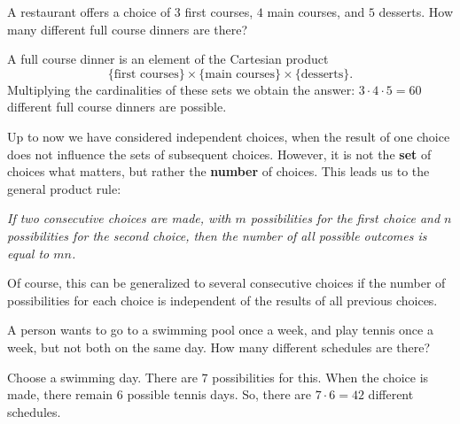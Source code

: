\begin{page}

\begin{exl}
A restaurant offers a choice of $3$ first courses, $4$ main courses, and $5$ desserts.
How many different full course dinners are there?

A full course dinner is an element of the Cartesian product
\[
\{\text{first courses}\} \times \{\text{main courses}\} \times \{\text{desserts}\}.
\]
Multiplying the cardinalities of these sets we obtain the answer: $3 \cdot 4 \cdot 5 = 60$ different full course dinners are possible.
\end{exl}

\end{page}

\begin{page}


Up to now we have considered independent choices,
when the result of one choice does not influence the sets of subsequent choices.
However, it is not the \textbf{set} of choices what matters, but rather the \textbf{number} of choices.
This leads us to the general product rule:
\begin{center}
\parbox{.9\textwidth}{\emph{If two consecutive choices are made, with $m$ possibilities for the first choice and $n$ possibilities for the second choice,
then the number of all possible outcomes is equal to $mn$.}}
\end{center}
Of course, this can be generalized to several consecutive choices
if the number of possibilities for each choice is independent of the results of all previous choices.


\end{page}

\begin{page}

\begin{exl}
A person wants to go to a swimming pool once a week, and play tennis once a week, but not both on the same day.
How many different schedules are there?

Choose a swimming day. There are $7$ possibilities for this.
When the choice is made, there remain $6$ possible tennis days.
So, there are $7 \cdot 6 = 42$ different schedules.
\end{exl}

\end{page}

